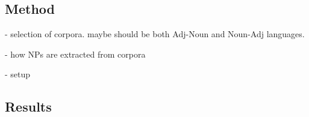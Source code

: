 


\subsection{Method}

- selection of corpora. maybe should be both Adj-Noun and Noun-Adj languages.

- how NPs are extracted from corpora

- setup

\subsection{Results}